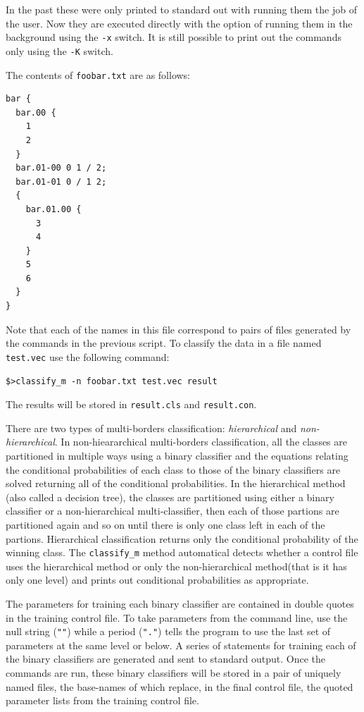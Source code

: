 \documentclass[12pt]{article}
\begin{document}
In the past these were only printed to standard out with running them the
job of the user. Now they are executed directly with the option of 
running them in the background using the \verb"-x" switch.
It is still possible to print out the commands only using the \verb"-K"
switch.

The contents of \verb"foobar.txt" are as follows:

\begin{verbatim}
bar {
  bar.00 {
    1
    2 
  }
  bar.01-00 0 1 / 2;
  bar.01-01 0 / 1 2;
  {
    bar.01.00 {
      3
      4
    }
    5
    6
  }
}
\end{verbatim}

Note that each of the names in this file correspond to pairs of files generated by the commands in the previous script. To classify the data in a file named \verb"test.vec" use the following command:

\begin{verbatim}
$>classify_m -n foobar.txt test.vec result
\end{verbatim}

The results will be stored in \verb"result.cls" and \verb"result.con".

  There are two types of multi-borders classification: {\it hierarchical} and {\it non-hierarchical}.  In non-hieararchical multi-borders classification, all the classes are partitioned in multiple ways using a binary classifier and the equations relating the conditional probabilities of each class to those of the binary classifiers are solved returning all of the conditional probabilities.  In the hierarchical method (also called a decision tree), the classes are partitioned using either a binary classifier or a non-hierarchical multi-classifier, then each of those partions are partitioned again and so on until there is only one class left in each of the partions.  Hierarchical classification returns only the conditional probability of the winning class.  The \verb/classify_m/ method automatical detects whether a control file uses the hierarchical method or only the non-hierarchical method(that is it has only one level) and prints out conditional probabilities as appropriate.  

  The parameters for training each binary classifier are contained in double quotes in the training control file.  To take parameters from the command line, use the null string (\verb/""/) while a period (\verb/"."/) tells the program to use the last set of parameters at the same level or below.  A series of statements for training each of the binary classifiers are generated and sent to standard output.  Once the commands are run, these binary classifiers will be stored in a pair of uniquely named files, the base-names of which replace, in the final control file, the quoted parameter lists from the training control file.
\end{document}
